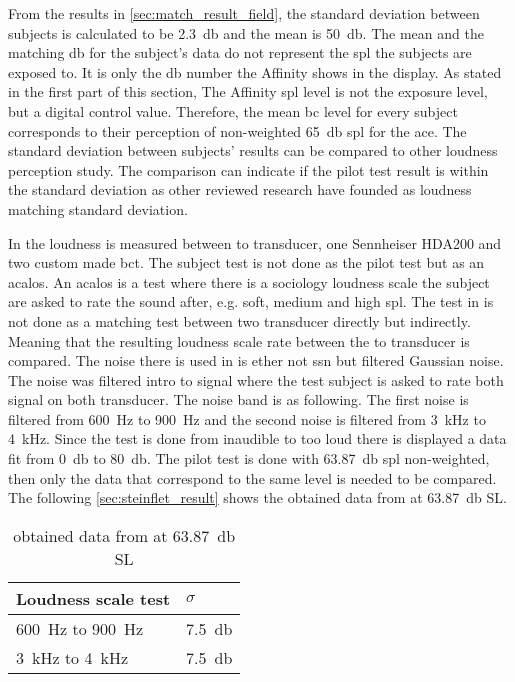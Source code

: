 From the results in \autoref{sec:match_result_field}, the standard deviation between subjects is calculated to be \SI{2.3}{\decibel} and the mean is \SI{50}{\decibel}. The mean and the matching \si{\decibel} for the subject's data do not represent the \gls{spl} the subjects are exposed to. It is only the \si{\decibel} number the Affinity shows in the display. As stated in the first part of this section, The Affinity  \gls{spl} level is not the exposure level, but a digital control value. Therefore, the mean \gls{bc} level for every subject corresponds to their perception of non-weighted \SI{65}{\decibel} \gls{spl}  for the \gls{ace}. The standard deviation between subjects' results can be compared to other loudness perception study. The comparison can indicate if the pilot test result is within the standard deviation as other reviewed research have founded as loudness matching standard deviation. 

In \citep{STENFELT201385} the loudness is measured between to transducer, one Sennheiser HDA200 and two custom made \gls{bct}. The subject test is not done as the pilot test but as an \gls{acalos}. An \gls{acalos} is a test where there is a sociology loudness scale the subject are asked to rate the sound after, e.g. soft, medium and high \gls{spl}. The test in \citep{STENFELT201385} is not done as a matching test between two transducer directly but indirectly. Meaning that the resulting loudness scale rate between the to transducer is compared. The noise there is used in \citep{STENFELT201385} is ether not \gls{ssn} but filtered Gaussian noise. The noise was filtered intro to signal where the test subject is asked to rate both signal on both transducer. The noise band is as following. The first noise is filtered from \SI{600}{\hertz} to \SI{900}{\hertz} and the second noise is filtered from \SI{3}{\kilo\hertz} to \SI{4}{\kilo\hertz}. Since the test is done from inaudible to too loud there is displayed a data fit from \SI{0}{\decibel} to \SI{80}{\decibel}. The pilot test is done with \SI{63.87}{\decibel} \gls{spl} non-weighted, then only the data that correspond to the same level is needed to be compared. The following \autoref{sec:steinflet_result} shows the obtained data from \citep{STENFELT201385} at \SI{63.87}{\decibel} SL.


\begin{table}[H]
\centering
\caption{obtained data from \citep{STENFELT201385} at \SI{63.87}{\decibel} SL}
\begin{tabular}{l|l}
Loudness scale test                        & $\sigma$            \\ \hline
\SI{600}{\hertz} to \SI{900}{\hertz}       & \SI{7.5}{\decibel} \\
\SI{3}{\kilo\hertz} to \SI{4}{\kilo\hertz} & \SI{7.5}{\decibel}
\end{tabular}
\label{sec:steinflet_result}
\end{table}

